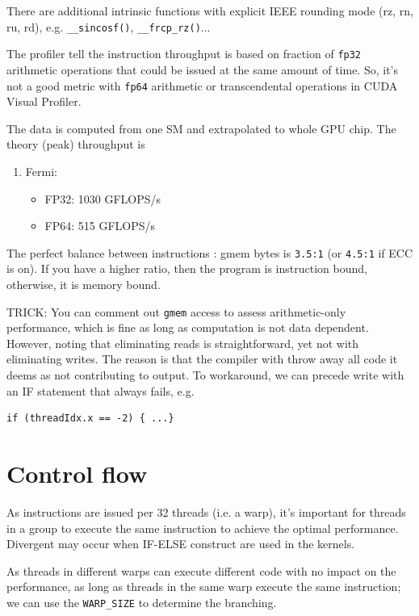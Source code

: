There are additional intrinsic functions with explicit IEEE rounding
mode (rz, rn, ru, rd), e.g. \verb!__sincosf()!, \verb!__frcp_rz()!...


The profiler tell the instruction throughput is based on fraction of
\verb!fp32! arithmetic operations that could be issued at the same
amount of time. So, it's not a good metric with \verb!fp64! arithmetic
or transcendental operations in CUDA Visual Profiler.


The data is computed from one SM and extrapolated to whole GPU chip. 
The theory (peak) throughput is
\begin{enumerate}
\item Fermi: 
  \begin{itemize}
  \item FP32: 1030 GFLOPS/s 
  \item FP64: 515 GFLOPS/s
  \end{itemize}
\end{enumerate}

\begin{framed}
  The perfect balance between instructions : gmem bytes is
  \verb!3.5:1! (or \verb!4.5:1! if ECC is on). If you have a higher
  ratio, then the program is instruction bound, otherwise, it is
  memory bound. 
\end{framed}


TRICK: You can comment out \verb!gmem! access to assess
arithmetic-only performance, which is fine as long as computation is
not data dependent. However, noting that eliminating reads is
straightforward, yet not with eliminating writes. The reason is that
the compiler with throw away all code it deems as not contributing to
output. To workaround, we can precede write with an IF statement that
always fails, e.g.
\begin{lstlisting}
if (threadIdx.x == -2) { ...} 
\end{lstlisting}

\section{Control flow}
\label{sec:control-flow}

As instructions are issued per 32 threads (i.e. a warp), it's
important for threads in a group to execute the same instruction to
achieve the optimal performance. Divergent may occur when IF-ELSE
construct are used in the kernels. 

As threads in different warps can execute different code with no
impact on the performance, as long as threads in the same warp execute
the same instruction; we can use the \verb!WARP_SIZE! to determine the
branching. 

